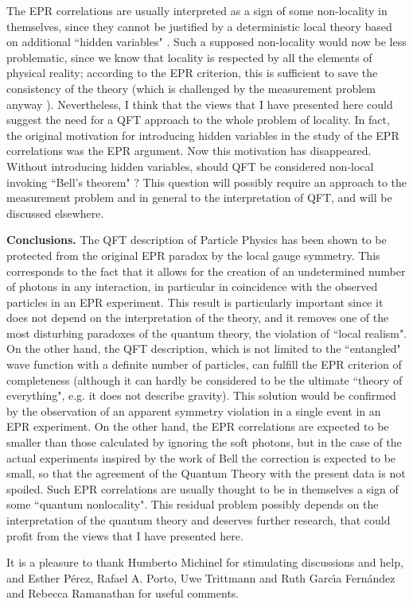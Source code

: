 \documentclass[aps,prl,showkeys,showpacs,preprint,groupedaddress,12pt]{revtex4}
\begin{document}
The EPR correlations are usually interpreted as a sign of some
non-locality in themselves, since they cannot be justified by a
deterministic local theory based on additional ``hidden variables"
\cite{Bell,Laloe}. Such a supposed non-locality would now be less
problematic, since we know that locality is respected by all the
elements of physical reality; according to the EPR criterion, this
is sufficient to save the consistency of the theory (which is
challenged by the measurement problem anyway \cite{Laloe}).
Nevertheless, I think that the views that I have presented here
could suggest the need for a QFT approach to the whole problem of
locality. In fact, the original motivation for introducing hidden
variables in the study of the EPR correlations was the EPR
argument. Now this motivation has disappeared. Without introducing
hidden variables, should QFT be considered non-local invoking
``Bell's theorem" \cite{Bell,Laloe}? This question will possibly
require an approach to the measurement problem and in general to
the interpretation of QFT, and will be discussed elsewhere.

{\bf Conclusions.} The QFT description of Particle Physics has
been shown to be protected from the original EPR paradox by the
local gauge symmetry. This corresponds to the fact that it allows
for the creation of an undetermined number of photons in any
interaction, in particular in coincidence with the observed
particles in an EPR experiment. This result is particularly
important since it does not depend on the interpretation of the
theory, and it removes one of the most disturbing paradoxes of the
quantum theory, the violation of ``local realism". On the other
hand, the QFT description, which is not limited to the
``entangled" wave function with a definite number of particles,
can fulfill the EPR criterion of completeness (although it can
hardly be considered to be the ultimate ``theory of everything",
e.g. it does not describe gravity). This solution would be
confirmed by the observation of an apparent symmetry violation in
a single event in an EPR experiment. On the other hand, the EPR
correlations are expected to be smaller than those calculated by
ignoring the soft photons, but in the case of the actual
experiments inspired by the work of Bell the correction is
expected to be small, so that the agreement of the Quantum Theory
with the present data is not spoiled. Such EPR correlations are
usually thought to be in themselves a sign of some ``quantum
nonlocality". This residual problem possibly depends on the
interpretation of the quantum theory and deserves further
research, that could profit from the views that I have presented
here.

It is a pleasure to thank Humberto Michinel for stimulating
discussions and help, and Esther P\'erez, Rafael A. Porto, Uwe
Trittmann and Ruth Garc\'\i a Fern\'andez and Rebecca Ramanathan
for useful comments.


\end{document}
